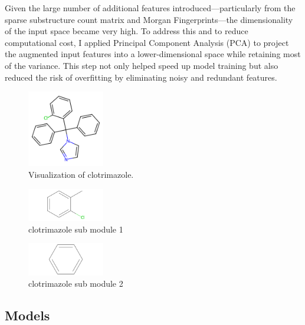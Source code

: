 \documentclass[11pt, oneside]{article}   	%
\begin{document}
Given the large number of additional features introduced—particularly from the sparse substructure count matrix and Morgan Fingerprints—the dimensionality of the input space became very high. To address this and to reduce computational cost, I applied Principal Component Analysis (PCA) to project the augmented input features into a lower-dimensional space while retaining most of the variance. This step not only helped speed up model training but also reduced the risk of overfitting by eliminating noisy and redundant features.



\begin{figure}[htbp]
  \centering
  \includegraphics[width=0.3\textwidth]{smiles1.png}
  \caption{Visualization of clotrimazole.}
  \label{fig:smiles}
\end{figure}

\begin{figure}[htbp]
  \centering
  \includegraphics[width=0.3\textwidth]{smiles1-split1.png}
  \caption{clotrimazole sub module 1}
  \label{fig:smiles1}
\end{figure}

\begin{figure}[htbp]
  \centering
  \includegraphics[width=0.3\textwidth]{smiles1-split2.png}
  \caption{clotrimazole sub module 2}
  \label{fig:smiles2}
\end{figure}



\subsection{Models}
\end{document}
